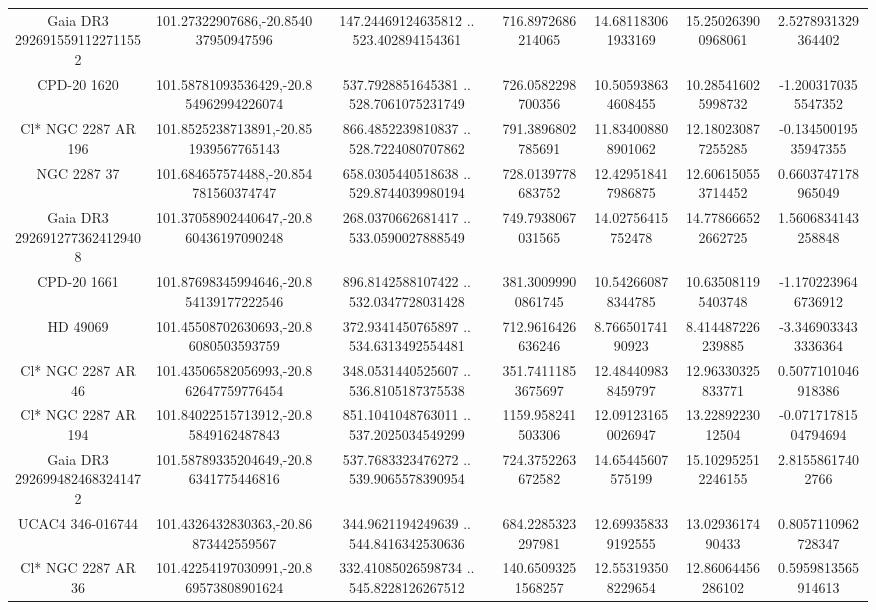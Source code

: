 \begin{table}
\begin{tabular}{ccccccc}
Gaia DR3 2926915591122711552 & 101.27322907686,-20.854037950947596 & 147.24469124635812 .. 523.402894154361 & 716.8972686214065 & 14.681183061933169 & 15.250263900968061 & 2.5278931329364402 \\
CPD-20  1620 & 101.58781093536429,-20.854962994226074 & 537.7928851645381 .. 528.7061075231749 & 726.0582298700356 & 10.505938634608455 & 10.285416025998732 & -1.2003170355547352 \\
Cl* NGC 2287     AR     196 & 101.8525238713891,-20.851939567765143 & 866.4852239810837 .. 528.7224080707862 & 791.3896802785691 & 11.834008808901062 & 12.180230877255285 & -0.13450019535947355 \\
NGC  2287    37 & 101.684657574488,-20.854781560374747 & 658.0305440518638 .. 529.8744039980194 & 728.0139778683752 & 12.429518417986875 & 12.606150553714452 & 0.6603747178965049 \\
Gaia DR3 2926912773624129408 & 101.37058902440647,-20.860436197090248 & 268.0370662681417 .. 533.0590027888549 & 749.7938067031565 & 14.02756415752478 & 14.778666522662725 & 1.5606834143258848 \\
CPD-20  1661 & 101.87698345994646,-20.854139177222546 & 896.8142588107422 .. 532.0347728031428 & 381.30099900861745 & 10.542660878344785 & 10.635081195403748 & -1.1702239646736912 \\
HD  49069 & 101.45508702630693,-20.86080503593759 & 372.9341450765897 .. 534.6313492554481 & 712.9616426636246 & 8.76650174190923 & 8.414487226239885 & -3.3469033433336364 \\
Cl* NGC 2287     AR      46 & 101.43506582056993,-20.862647759776454 & 348.0531440525607 .. 536.8105187375538 & 351.74111853675697 & 12.484409838459797 & 12.96330325833771 & 0.5077101046918386 \\
Cl* NGC 2287     AR     194 & 101.84022515713912,-20.85849162487843 & 851.1041048763011 .. 537.2025034549299 & 1159.958241503306 & 12.091231650026947 & 13.2289223012504 & -0.07171781504794694 \\
Gaia DR3 2926994824683241472 & 101.58789335204649,-20.86341775446816 & 537.7683323476272 .. 539.9065578390954 & 724.3752263672582 & 14.65445607575199 & 15.102952512246155 & 2.81558617402766 \\
UCAC4 346-016744 & 101.4326432830363,-20.86873442559567 & 344.9621194249639 .. 544.8416342530636 & 684.2285323297981 & 12.699358339192555 & 13.0293617490433 & 0.8057110962728347 \\
Cl* NGC 2287     AR      36 & 101.42254197030991,-20.869573808901624 & 332.41085026598734 .. 545.8228126267512 & 140.65093251568257 & 12.553193508229654 & 12.86064456286102 & 0.5959813565914613 \\

\end{tabular}
\end{table}
